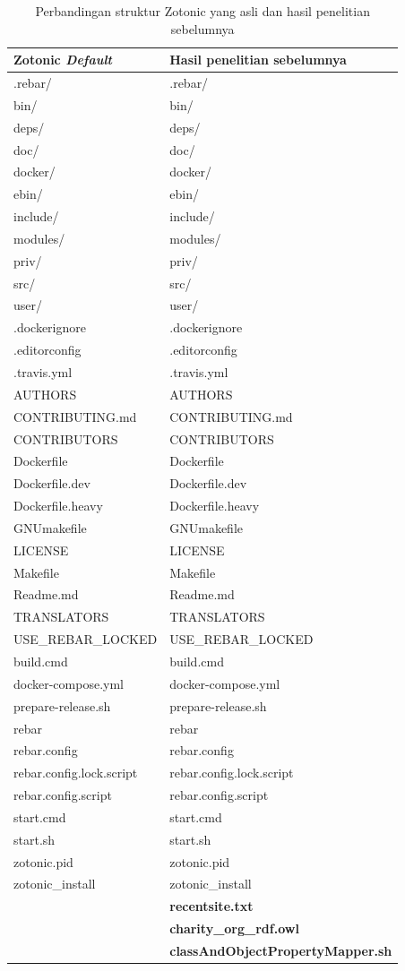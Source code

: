 \begin{longtable}{| l | l |}
	\caption{Perbandingan struktur Zotonic yang asli dan hasil penelitian sebelumnya}
	\label{tab:structure}
	\hline
	\textbf{Zotonic \textit{Default}} & \textbf{Hasil penelitian sebelumnya} \\
	\hline
	.rebar/ & .rebar/ \\
	bin/ & bin/ \\
	deps/ & deps/ \\
	doc/ & doc/ \\
	docker/ & docker/ \\
	ebin/ & ebin/ \\
	include/ & include/ \\
	modules/ & modules/ \\
	priv/ & priv/ \\
	src/ & src/ \\
	user/ & user/ \\
	.dockerignore & .dockerignore \\
	.editorconfig & .editorconfig \\
	.travis.yml & .travis.yml \\
	AUTHORS & AUTHORS \\
	CONTRIBUTING.md & CONTRIBUTING.md \\
	CONTRIBUTORS & CONTRIBUTORS \\
	Dockerfile & Dockerfile \\
	Dockerfile.dev & Dockerfile.dev \\
	Dockerfile.heavy & Dockerfile.heavy \\
	GNUmakefile & GNUmakefile \\
	LICENSE & LICENSE \\
	Makefile & Makefile \\
	Readme.md & Readme.md \\
	TRANSLATORS & TRANSLATORS \\
	USE\_REBAR\_LOCKED & USE\_REBAR\_LOCKED \\
	build.cmd & build.cmd \\
	docker-compose.yml & docker-compose.yml \\
	prepare-release.sh & prepare-release.sh \\
	rebar & rebar \\
	rebar.config & rebar.config \\
	rebar.config.lock.script & rebar.config.lock.script \\
	rebar.config.script & rebar.config.script \\
	start.cmd & start.cmd \\
	start.sh & start.sh\\
	zotonic.pid & zotonic.pid \\
	zotonic\_install & zotonic\_install \\
	& \textbf{recentsite.txt} \\
	& \textbf{charity\_org\_rdf.owl}\\
	& \textbf{classAndObjectPropertyMapper.sh} \\
	\hline
\end{longtable}
	
